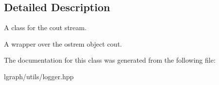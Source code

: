 \subsection{Detailed Description}
A class for the cout stream. 

A wrapper over the ostrem object cout. 

The documentation for this class was generated from the following file\+:\begin{DoxyCompactItemize}
\item 
lgraph/utils/logger.\+hpp\end{DoxyCompactItemize}

